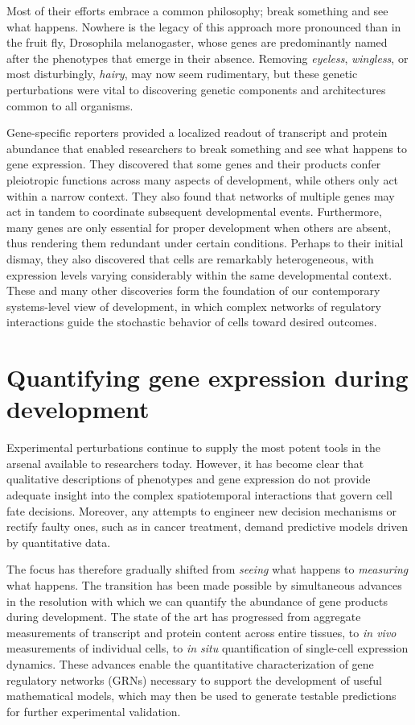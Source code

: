Most of their efforts embrace a common philosophy; break something and see what happens. Nowhere is the legacy of this approach more pronounced than in the fruit fly, Drosophila melanogaster, whose genes are predominantly named after the phenotypes that emerge in their absence. Removing \textit{eyeless}, \textit{wingless}, or most disturbingly, \textit{hairy}, may now seem rudimentary, but these genetic perturbations were vital to discovering genetic components and architectures common to all organisms. 

Gene-specific reporters provided a localized readout of transcript and protein abundance that enabled researchers to break something and see what happens to gene expression. They discovered that some genes and their products confer pleiotropic functions across many aspects of development, while others only act within a narrow context. They also found that networks of multiple genes may act in tandem to coordinate subsequent developmental events. Furthermore, many genes are only essential for proper development when others are absent, thus rendering them redundant under certain conditions. Perhaps to their initial dismay, they also discovered that cells are remarkably heterogeneous, with expression levels varying considerably within the same developmental context. These and many other discoveries form the foundation of our contemporary systems-level view of development, in which complex networks of regulatory interactions guide the stochastic behavior of cells toward desired outcomes.

\section{Quantifying gene expression during development}

Experimental perturbations continue to supply the most potent tools in the arsenal available to researchers today. However, it has become clear that qualitative descriptions of phenotypes and gene expression do not provide adequate insight into the complex spatiotemporal interactions that govern cell fate decisions. Moreover, any attempts to engineer new decision mechanisms or rectify faulty ones, such as in cancer treatment, demand predictive models driven by quantitative data.

The focus has therefore gradually shifted from \textit{seeing} what happens to \textit{measuring} what happens. The transition has been made possible by simultaneous advances in the resolution with which we can quantify the abundance of gene products during development. The state of the art has progressed from aggregate measurements of transcript and protein content across entire tissues, to \emph{in vivo} measurements of individual cells, to \emph{in situ} quantification of single-cell expression dynamics. These advances enable the quantitative characterization of gene regulatory networks (GRNs) necessary to support the development of useful mathematical models, which may then be used to generate testable predictions for further experimental validation.


